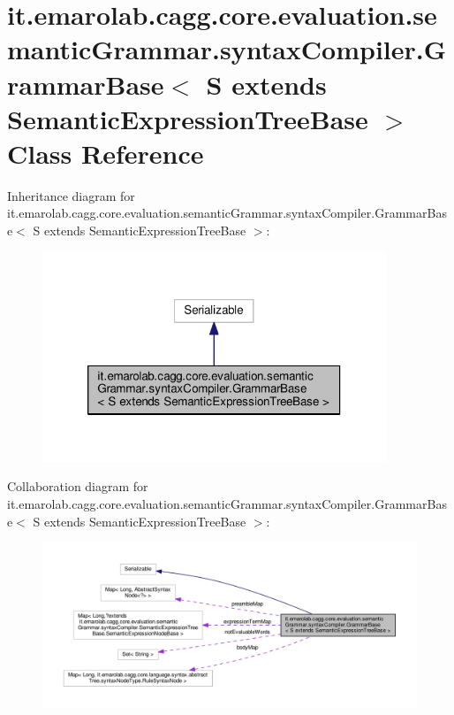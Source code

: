 \hypertarget{classit_1_1emarolab_1_1cagg_1_1core_1_1evaluation_1_1semanticGrammar_1_1syntaxCompiler_1_1Grammac6e795d7438edf939adda9d5323937f2}{\section{it.\-emarolab.\-cagg.\-core.\-evaluation.\-semantic\-Grammar.\-syntax\-Compiler.\-Grammar\-Base$<$ S extends Semantic\-Expression\-Tree\-Base $>$ Class Reference}
\label{classit_1_1emarolab_1_1cagg_1_1core_1_1evaluation_1_1semanticGrammar_1_1syntaxCompiler_1_1Grammac6e795d7438edf939adda9d5323937f2}
}


Inheritance diagram for it.\-emarolab.\-cagg.\-core.\-evaluation.\-semantic\-Grammar.\-syntax\-Compiler.\-Grammar\-Base$<$ S extends Semantic\-Expression\-Tree\-Base $>$\-:\nopagebreak
\begin{figure}[H]
\begin{center}
\leavevmode
\includegraphics[width=292pt]{classit_1_1emarolab_1_1cagg_1_1core_1_1evaluation_1_1semanticGrammar_1_1syntaxCompiler_1_1Grammafb857abbba55fb831fb0699297654ceb}
\end{center}
\end{figure}


Collaboration diagram for it.\-emarolab.\-cagg.\-core.\-evaluation.\-semantic\-Grammar.\-syntax\-Compiler.\-Grammar\-Base$<$ S extends Semantic\-Expression\-Tree\-Base $>$\-:\nopagebreak
\begin{figure}[H]
\begin{center}
\leavevmode
\includegraphics[width=350pt]{classit_1_1emarolab_1_1cagg_1_1core_1_1evaluation_1_1semanticGrammar_1_1syntaxCompiler_1_1Grammad3809047eca86180215f107fe2aa8752}
\end{center}
\end{figure}
